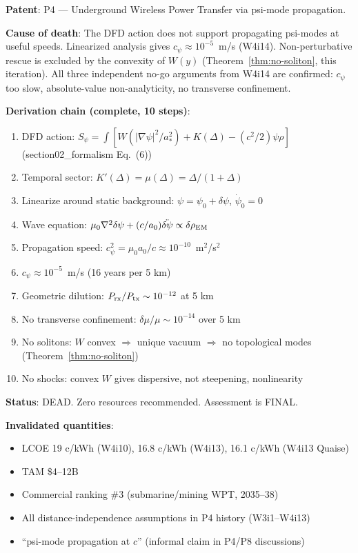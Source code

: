 \documentclass[11pt]{article}
\begin{document}
\begin{tcolorbox}[colback=red!5!white, colframe=red!60!black,
  title=\textbf{P4 DEATH CERTIFICATE}]

\textbf{Patent}: P4 --- Underground Wireless Power Transfer via psi-mode
propagation.

\textbf{Cause of death}: The DFD action does not support propagating
psi-modes at useful speeds. Linearized analysis gives $c_\psi \approx
10^{-5}$~m/s (W4i14). Non-perturbative rescue is excluded by the
convexity of $W(y)$ (Theorem~\ref{thm:no-soliton}, this iteration).
All three independent no-go arguments from W4i14 are confirmed:
$c_\psi$ too slow, absolute-value non-analyticity, no transverse confinement.

\textbf{Derivation chain (complete, 10 steps)}:
\begin{enumerate}[nosep]
\item DFD action: $S_\psi = \int[W(|\nabla\psi|^2/a_*^2) + K(\Delta)
  - (c^2/2)\psi\rho]$ (section02\_formalism Eq.~(6))
\item Temporal sector: $K'(\Delta) = \mu(\Delta) = \Delta/(1+\Delta)$
\item Linearize around static background: $\psi = \psi_0 + \delta\psi$,
  $\dot\psi_0 = 0$
\item Wave equation: $\mu_0\nabla^2\delta\psi + (c/a_0)\ddot{\delta\psi}
  \propto \delta\rho_{\rm EM}$
\item Propagation speed: $c_\psi^2 = \mu_0 a_0/c \approx 10^{-10}$~m$^2$/s$^2$
\item $c_\psi \approx 10^{-5}$~m/s (16 years per 5 km)
\item Geometric dilution: $P_{\rm rx}/P_{\rm tx} \sim 10^{-12}$ at 5 km
\item No transverse confinement: $\delta\mu/\mu \sim 10^{-14}$ over 5 km
\item No solitons: $W$ convex $\Rightarrow$ unique vacuum $\Rightarrow$
  no topological modes (Theorem~\ref{thm:no-soliton})
\item No shocks: convex $W$ gives dispersive, not steepening, nonlinearity
\end{enumerate}

\textbf{Status}: DEAD. Zero resources recommended. Assessment is FINAL.

\textbf{Invalidated quantities}:
\begin{itemize}[nosep]
\item LCOE 19 c/kWh (W4i10), 16.8 c/kWh (W4i13), 16.1 c/kWh (W4i13 Quaise)
\item TAM \$4--12B
\item Commercial ranking \#3 (submarine/mining WPT, 2035--38)
\item All distance-independence assumptions in P4 history (W3i1--W4i13)
\item ``psi-mode propagation at $c$'' (informal claim in P4/P8 discussions)
\end{itemize}
\end{tcolorbox}
\end{document}
